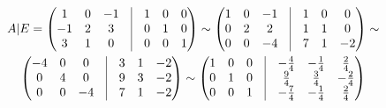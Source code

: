 \begin{eg}
  \begin{gather*}
    A | E = 
    \left(\begin{matrix}
      1 & 0 & -1 \\
      -1 & 2 & 3 \\
      3 & 1 & 0
    \end{matrix}
    \quad \vline \quad
    \begin{matrix}
      1 & 0 & 0 \\
      0 & 1 & 0 \\
      0 & 0 & 1
    \end{matrix}\right) \sim  
    \left( 
    \begin{matrix}
      1 & 0 & -1 \\
      0 & 2 & 2 \\
      0 & 0 & -4
    \end{matrix}
    \quad \vline \quad
    \begin{matrix}
      1 & 0 & 0 \\
      1 & 1 & 0 \\
      7 & 1 & -2
    \end{matrix}
    \right) \sim \\ 
    \left( 
    \begin{matrix}
      -4 & 0 & 0 \\
      0 & 4 & 0 \\
      0 & 0 & -4 
    \end{matrix}
    \quad \vline \quad
    \begin{matrix}
      3 & 1 & -2 \\
      9 & 3 & -2 \\
      7 & 1 & -2
    \end{matrix}
    \right) \sim 
    \left( 
    \begin{matrix}
      1 & 0 & 0 \\
      0 & 1 & 0 \\
      0 & 0 & 1
    \end{matrix}
    \quad \vline \quad
    \begin{matrix}
      -\frac{4}{4} & -\frac{1}{4} & \frac{2}{4} \\
      \frac{9}{4} & \frac{3}{4} & -\frac{2}{4} \\
      -\frac{7}{4} & -\frac{1}{4} & \frac{2}{4}
    \end{matrix}
    \right) 
  \end{gather*}
\end{eg}

